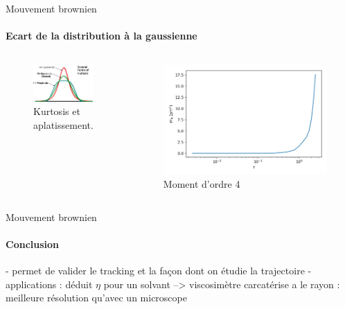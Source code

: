 \documentclass[11pt]{beamer}
\begin{document}
\begin{frame}{Mouvement brownien}
\framesubtitle{Ecart de la distribution à la gaussienne}
\begin{columns}
	\begin{figure}
	\centering
	\includegraphics[width=0.9\linewidth]{exemples_kurtosis_3.png}
	\caption{Kurtosis et aplatissement.}
	\label{fig:kurtosis}
	\end{figure}
	
	\begin{figure}
    	\centering
    	\includegraphics[width=0.9\linewidth]{m_4.png}
    	\caption{Moment d'ordre 4}
    	\label{fig:moment4}
	\end{figure}
\end{columns}
\end{frame}

\begin{frame}{Mouvement brownien}
\framesubtitle{Conclusion}
- permet de valider le tracking et la façon dont on étudie la trajectoire
-applications : déduit $\eta$ pour un solvant --> viscosimètre
            carcatérise a le rayon : meilleure résolution qu'avec un microscope
\end{frame}
\end{document}
